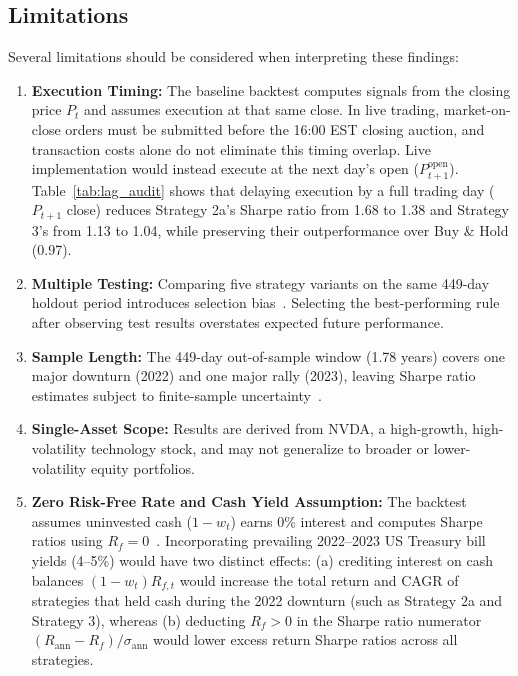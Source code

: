 \documentclass[11pt, a4paper]{article}
\begin{document}
\subsection{Limitations}
\label{sec:limits}
Several limitations should be considered when interpreting these findings:
\begin{enumerate}
    \item \textbf{Execution Timing:} The baseline backtest computes signals from the closing price $P_t$ and assumes execution at that same close. In live trading, market-on-close orders must be submitted before the 16:00 EST closing auction, and transaction costs alone do not eliminate this timing overlap. Live implementation would instead execute at the next day's open ($P_{t+1}^{\text{open}}$). Table~\ref{tab:lag_audit} shows that delaying execution by a full trading day ($P_{t+1}$ close) reduces Strategy 2a's Sharpe ratio from 1.68 to 1.38 and Strategy 3's from 1.13 to 1.04, while preserving their outperformance over Buy \& Hold (0.97).
    \item \textbf{Multiple Testing:} Comparing five strategy variants on the same 449-day holdout period introduces selection bias~\cite{white2000, harvey2016}. Selecting the best-performing rule after observing test results overstates expected future performance.
    \item \textbf{Sample Length:} The 449-day out-of-sample window (1.78 years) covers one major downturn (2022) and one major rally (2023), leaving Sharpe ratio estimates subject to finite-sample uncertainty~\cite{lo2002}.
    \item \textbf{Single-Asset Scope:} Results are derived from NVDA, a high-growth, high-volatility technology stock, and may not generalize to broader or lower-volatility equity portfolios.
    \item \textbf{Zero Risk-Free Rate and Cash Yield Assumption:} The backtest assumes uninvested cash ($1 - w_t$) earns 0\% interest and computes Sharpe ratios using $R_f = 0$~\cite{sharpe1994}. Incorporating prevailing 2022--2023 US Treasury bill yields (4--5\%) would have two distinct effects: (a) crediting interest on cash balances $(1 - w_t)R_{f,t}$ would increase the total return and CAGR of strategies that held cash during the 2022 downturn (such as Strategy 2a and Strategy 3), whereas (b) deducting $R_f > 0$ in the Sharpe ratio numerator $(R_{\text{ann}} - R_f)/\sigma_{\text{ann}}$ would lower excess return Sharpe ratios across all strategies.
\end{enumerate}
\end{document}
